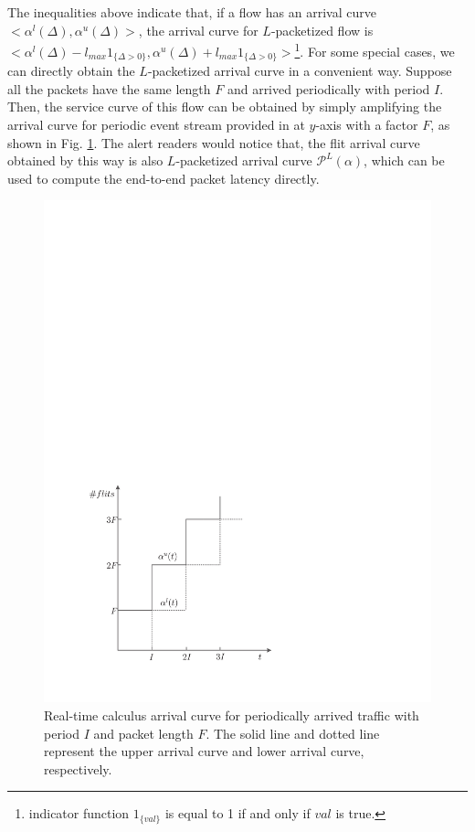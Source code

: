 \documentclass[10pt,journal]{IEEEtran}
\begin{document}
The inequalities above indicate that, if a flow has an arrival curve $<\alpha^l(\Delta),\alpha^u(\Delta)>$, the arrival curve for $L$-packetized flow is $<\alpha^l(\Delta)-l_{max}1_{\{\Delta>0\}},\alpha^u(\Delta)+l_{max}1_{\{\Delta>0\}}>$\footnote{indicator function $1_{\{val\}}$ is equal to 1 if and only if $val$ is true.}. For some special cases, we can directly obtain the $L$-packetized arrival curve in a convenient way. Suppose all the packets have the same length $F$ and arrived periodically with period $I$. Then, the service curve of this flow can be obtained by simply amplifying the arrival curve for periodic event stream provided in \cite{1253607} at $y$-axis with a factor $F$, as shown in Fig. \ref{ac}. The alert readers would notice that, the flit arrival curve obtained by this way is also $L$-packetized arrival curve $\mathcal{P}^L(\alpha)$, which can be used to compute the end-to-end packet latency directly.
\begin{figure}
  \centering
  \includegraphics[scale=0.5]{figures/AC.pdf}
  \caption{Real-time calculus arrival curve for periodically arrived traffic with period $I$ and packet length $F$. The solid line and dotted line represent the upper arrival curve and lower arrival curve, respectively.}\label{ac}
\end{figure}
\end{document}
